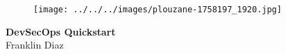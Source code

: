 \begin{titlepage}
    \centering
        \vspace{0mm}
            \begin{figure}[!h]
                \centering
                \texttt{[image: ../../../images/plouzane-1758197\_1920.jpg]}
            \end{figure}
        \vspace*{40mm} %
        \begin{flushright}
            \textbf{\textsf{\Huge {DevSecOps Quickstart}}}\\
            \vspace{5mm}
            \Large \textsf{Franklin Diaz}\\
            \vspace*{0mm}
        \end{flushright}
	\clearpage
		\vspace*{\fill}

\end{titlepage}

